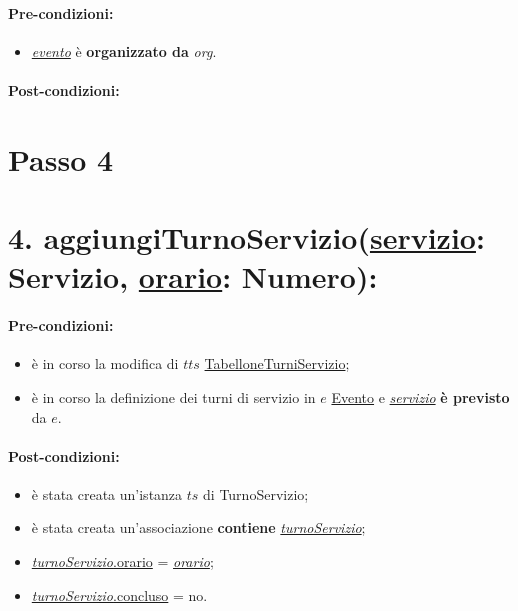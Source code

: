 \paragraph{Pre-condizioni:}
\begin{itemize}
     \item \underline{\textit{evento}} è \textbf{organizzato da} {\textit{org}}.
\end{itemize}

\paragraph{Post-condizioni:}

\section{Passo 4}
\section*{4. aggiungiTurnoServizio(\underline{servizio}: Servizio, \underline{orario}: Numero):}

\paragraph{Pre-condizioni:}
\begin{itemize}
    \item è in corso la modifica di $tts$ \underline{TabelloneTurniServizio};
    \item è in corso la definizione dei turni di servizio in $e$ \underline{Evento} e \underline{\textit{servizio}} \textbf{è previsto} da $e$.
\end{itemize}

\paragraph{Post-condizioni:}
\begin{itemize}
   \item è stata creata un'istanza $ts$ di TurnoServizio;
    \item è stata creata un'associazione \textbf{contiene} \underline{\textit{turnoServizio}};
    \item \underline{\textit{turnoServizio}.orario} = \underline{\textit{orario}};
    \item \underline{\textit{turnoServizio}.concluso}  = no.
\end{itemize}


